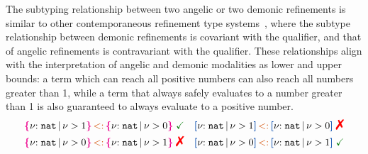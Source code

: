 The subtyping relationship between two angelic or two demonic
refinements is similar to other contemporaneous refinement type
systems~\cite{LiquidHaskell, CoverageType}, where the subtype
relationship between demonic refinements is covariant with the
qualifier, and that of angelic refinements is contravariant with the
qualifier. These relationships align with the interpretation of
angelic and demonic modalities as lower and upper bounds: a term
which can reach all positive numbers can also reach all numbers
greater than 1, while a term that always safely evaluates to a number
greater than 1 is also guaranteed to always evaluate to a positive
number.
\vspace{-0.2em}
\begin{align*}
  &\ort{\Nat}{\vnu > 1} \subty \ort{\Nat}{\vnu > 0}\;\judgok
  &&\urt{\Nat}{\vnu > 1} \subty \urt{\Nat}{\vnu > 0} \;\judgfail \\
  & \ort{\Nat}{\vnu > 0} \subty \ort{\Nat}{\vnu > 1}  \;\judgfail
  && \urt{\Nat}{\vnu > 0} \subty \urt{\Nat}{\vnu > 1}\;\judgok
\end{align*} %

